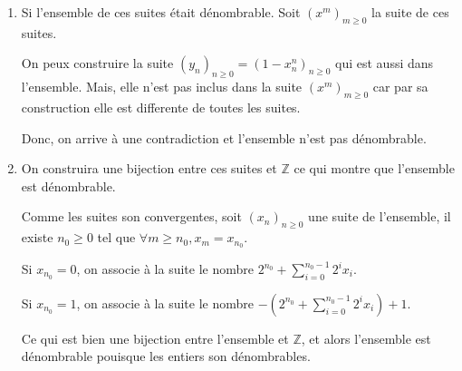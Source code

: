 \documentclass[10pt,a4paper,oneside]{article}
\newenvironment{solution}[1][Solution]{\begin{trivlist}
\item[\hskip \labelsep {\bfseries #1}]}{\end{trivlist}}
\begin{document}
\begin{solution}
\begin{enumerate}
\item
Si l'ensemble de ces suites était dénombrable. Soit $(x^m)_{m \geq 0}$ la suite de ces suites.

On peux construire la suite $(y_n)_{n \geq 0} = (1 - x^n_n)_{n \geq 0}$ qui est aussi dans l'ensemble. Mais, elle n'est pas inclus dans la suite $(x^m)_{m \geq 0}$ car par sa construction elle est differente de toutes les suites.

Donc, on arrive à une contradiction et l'ensemble n'est pas dénombrable.

\item
On construira une bijection entre ces suites et $\mathbb{Z}$ ce qui montre que l'ensemble est dénombrable.

Comme les suites son convergentes, soit $(x_n)_{n \geq 0}$ une suite de l'ensemble, il existe $n_0 \geq 0$ tel que $\forall m \geq n_0, x_m = x_{n_0}$.

Si $x_{n_0} = 0$, on associe à la suite le nombre $2^{n_0} + \sum_{i = 0}^{n_0 - 1} 2^i x_i$.

Si $x_{n_0} = 1$, on associe à la suite le nombre $-(2^{n_0} + \sum_{i = 0}^{n_0 - 1} 2^i x_i) + 1$.

Ce qui est bien une bijection entre l'ensemble et $\mathbb{Z}$, et alors l'ensemble est dénombrable pouisque les entiers son dénombrables.
\end{enumerate}
\end{solution}
\end{document}
